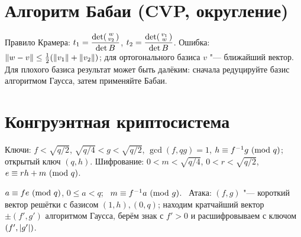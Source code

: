 \documentclass{ca-handout}
\begin{document}
\section{Алгоритм Бабаи (CVP, округление)}
\begin{reminder}[title={$w = t_1 v_1 + t_2 v_2$, \ $v = \round{t_1} v_1 + \round{t_2} v_2$}]
Правило Крамера: $t_1 = \dfrac{\det\begin{psmallmatrix} w \\ v_2 \end{psmallmatrix}}{\det B}$,
$t_2 = \dfrac{\det\begin{psmallmatrix} v_1 \\ w \end{psmallmatrix}}{\det B}$.
Ошибка: $\lVert w - v\rVert \le \frac12(\lVert v_1\rVert + \lVert v_2\rVert)$; для ортогонального базиса $v$ "---
ближайший вектор. Для плохого базиса результат может быть далёким: сначала редуцируйте базис
алгоритмом Гаусса, затем применяйте Бабаи.
\end{reminder}

\section{Конгруэнтная криптосистема}
Ключи: $f < \sqrt{q/2}$, $\sqrt{q/4} < g < \sqrt{q/2}$, $\gcd(f, qg) = 1$,
$h \equiv f^{-1}g\ (\mathrm{mod}\ q)$; открытый ключ $(q, h)$. Шифрование: $0 < m < \sqrt{q/4}$,
$0 < r < \sqrt{q/2}$, $e \equiv rh + m\ (\mathrm{mod}\ q)$.
\begin{reminder}[title={Расшифрование и атака}]
$a \equiv fe\ (\mathrm{mod}\ q)$, $0 \le a < q$; \ $m \equiv f^{-1}a\ (\mathrm{mod}\ g)$. \
Атака: $(f, g)$ "--- короткий вектор решётки с базисом $(1, h), (0, q)$; находим кратчайший
вектор $\pm(f', g')$ алгоритмом Гаусса, берём знак с $f' > 0$ и расшифровываем с ключом
$(f', \lvert g'\rvert)$.
\end{reminder}
\end{document}
